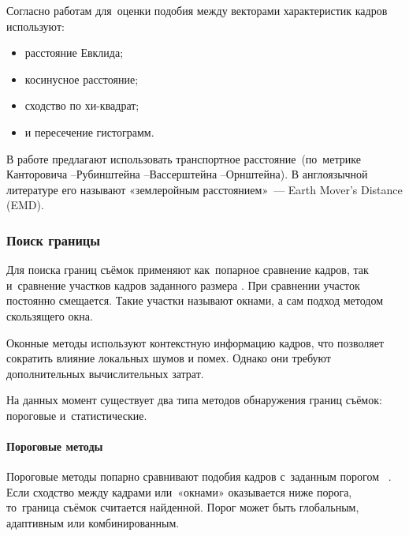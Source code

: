 Согласно работам \cite{Lu:2004} \cite{Camara-Chavez:2007} \cite{Cooper:2007}
для~оценки подобия между векторами характеристик кадров используют:
\begin{itemize}
    \item расстояние Евклида;
    \item косинусное расстояние;
    \item сходство по хи-квадрат;
    \item и пересечение гистограмм.
\end{itemize}

В работе \cite{Hoi:2006} предлагают использовать
транспортное расстояние\ (по~метрике
Канторовича
--Рубинштейна
--Вассерштейна
--Орнштейна).
В англоязычной литературе его называют
«землеройным расстоянием»~—
Earth Mover's Distance (EMD).

\subsubsection{Поиск границы}

Для поиска границ съёмок применяют как~попарное сравнение
кадров, так и~сравнение участков кадров заданного размера \cite{Cooper:2007}.
При сравнении участок постоянно смещается.
Такие участки называют окнами,
а сам подход методом скользящего окна.

Оконные методы используют контекстную информацию кадров,
что позволяет сократить влияние локальных шумов и помех.
Однако они требуют дополнительных вычислительных затрат.

На данных момент существует два типа методов обнаружения границ съёмок:
пороговые и~статистические.


\paragraph{Пороговые методы}

Пороговые методы попарно сравнивают подобия кадров
с~заданным порогом~\cite{Ko:2006} \cite{Cernekova:2006}.
Если сходство между кадрами или~«окнами» оказывается ниже
порога, то~граница съёмок считается найденной.
Порог может быть глобальным, адаптивным или комбинированным.

